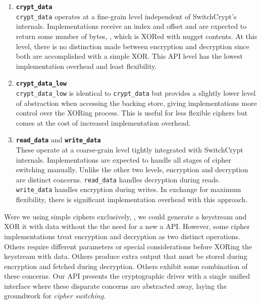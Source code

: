 \begin{enumerate}
   \item \textbf{\texttt{crypt\_data}}\\\texttt{crypt\_data}
   operates at a fine-grain level independent of SwitchCrypt's internals.
   Implementations receive an index and offset and are expected to return some
   number of bytes, , which is XORed with nugget contents. At
   this level, there is no distinction made between encryption and decryption
   since both are accomplished with a simple XOR. This API level has the lowest
   implementation overhead and least flexibility.

   \item \textbf{\texttt{crypt\_data\_low}}\\\texttt{crypt\_data\_low}
   is identical to \texttt{crypt\_data} but provides a slightly lower level of
   abstraction when accessing the backing store, giving implementations more
   control over the XORing process. This is useful for less flexible ciphers but
   comes at the cost of increased implementation overhead.

   \item \textbf{\texttt{read\_data}} and \textbf{\texttt{write\_data}}\\
   These operate at a coarse-grain level tightly integrated with SwitchCrypt
   internals. Implementations are expected to handle all stages of cipher
   switching manually. Unlike the other two levels, encryption and decryption
   are distinct concerns. \texttt{read\_data} handles decryption during reads.
   \texttt{write\_data} handles encryption during writes. In exchange for
   maximum flexibility, there is significant implementation overhead with this
   approach.
\end{enumerate}

Were we using simple ciphers exclusively, , we could generate a keystream and XOR it with data without the
the need for a new a API. However, some cipher implementations treat
encryption and decryption as two distinct operations. Others require different
parameters or special considerations before XORing the keystream with data.
Others produce extra output that must be stored during encryption and fetched
during decryption. Others exhibit some combination of these concerns. Our API
presents the cryptographic driver with a single unified interface where these
disparate concerns are abstracted away, laying the groundwork for
\emph{cipher switching}.

